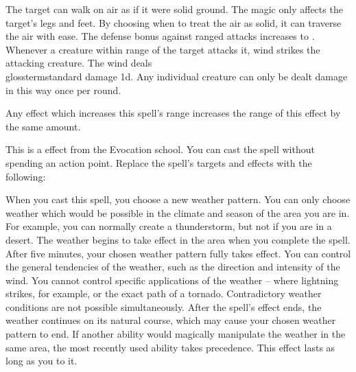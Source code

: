 The target can walk on air as if it were solid ground.
The magic only affects the target's legs and feet.
By choosing when to treat the air as solid, it can traverse the air with ease.
The defense bonus against ranged attacks increases to .
Whenever a creature within \rngclose range of the target attacks it, wind strikes the attacking creature.
The wind deals \\glossterm{standard damage} \minus1d.
Any individual creature can only be dealt damage in this way once per round.
\par Any effect which increases this spell's range increases the range of this effect by the same amount.
\par
This is a  effect from the Evocation school.
You can cast the spell without spending an action point.
Replace the spell's targets and effects with the following:
\begin{spellcontent}
\begin{augmenttargetinginfo}
\end{augmenttargetinginfo}
\begin{augmenteffects}
\spelleffect
When you cast this spell, you choose a new weather pattern.
You can only choose weather which would be possible in the climate and season of the area you are in.
For example, you can normally create a thunderstorm, but not if you are in a desert.
The weather begins to take effect in the area when you complete the spell.
After five minutes, your chosen weather pattern fully takes effect.
You can control the general tendencies of the weather, such as the direction and intensity of the wind.
You cannot control specific applications of the weather -- where lightning strikes, for example, or the exact path of a tornado.
Contradictory weather conditions are not possible simultaneously.
After the spell's effect ends, the weather continues on its natural course, which may cause your chosen weather pattern to end.
If another ability would magically manipulate the weather in the same area, the most recently used ability takes precedence.
This effect lasts as long as you  to it.
\end{augmenteffects}
\end{spellcontent}
